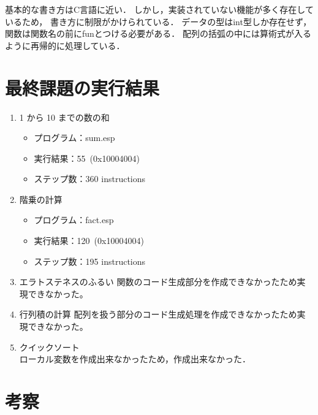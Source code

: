 \documentclass[11pt,a4j]{jarticle}
\begin{document}
基本的な書き方はC言語に近い．
しかし，実装されていない機能が多く存在しているため，
書き方に制限がかけられている．
データの型はint型しか存在せず，関数は関数名の前にfunとつける必要がある．
配列の括弧の中には算術式が入るように再帰的に処理している．



\section{最終課題の実行結果} %

\begin{enumerate}
\item {1 から 10 までの数の和 }
  \begin{itemize}
  \item
    プログラム：sum.esp
  \item
    実行結果：55~(0x10004004) %
  \item
    ステップ数：360 instructions %
  \end{itemize}
\item {階乗の計算}
  \begin{itemize}
  \item
    プログラム：fact.esp
  \item
    実行結果：120~(0x10004004) %
  \item
    ステップ数：195 instructions %
  \end{itemize}
\item {エラトステネスのふるい}
  関数のコード生成部分を作成できなかったため実現できなかった。
\item {行列積の計算}
  配列を扱う部分のコード生成処理を作成できなかったため実現できなかった。
\item {クイックソート}\\
  ローカル変数を作成出来なかったため，作成出来なかった．
\end{enumerate}



\section{考察}
\end{document}
